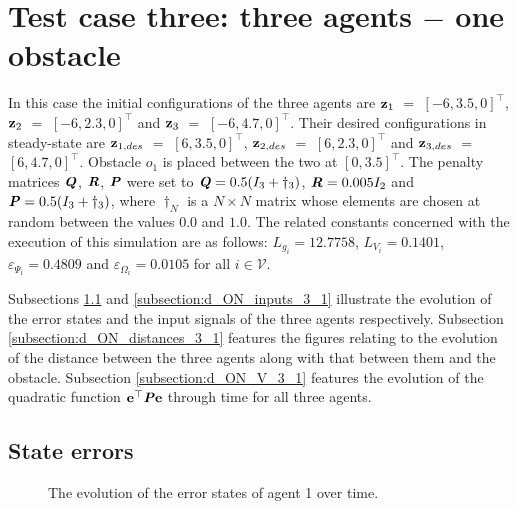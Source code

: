\section{Test case three: three agents $-$ one obstacle}

In this case the initial configurations of the three agents are
$\bm{\mathbf{z}}_1$ $=$ $[-6, 3.5, 0]^{\top}$,
$\bm{\mathbf{z}}_2$ $=$ $[-6, 2.3, 0]^{\top}$ and
$\bm{\mathbf{z}}_3$ $=$ $[-6, 4.7, 0]^{\top}$.
Their desired configurations in steady-state are
$\bm{\mathbf{z}}_{1,des}$ $=$ $[6, 3.5, 0]^{\top}$,
$\bm{\mathbf{z}}_{2,des}$ $=$ $[6, 2.3, 0]^{\top}$ and
$\bm{\mathbf{z}}_{3,des}$ $=$ $[6, 4.7, 0]^{\top}$.
Obstacle $o_1$ is placed between the two at $[0, 3.5]^{\top}$. The penalty
matrices $\bm{\mathit{Q}}$, $\bm{\mathit{R}}$, $\bm{\mathit{P}}$ were set to
$\bm{\mathit{Q}} = 0.5 (I_3 + \dagger_3)$, $\bm{\mathit{R}} = 0.005 I_2$ and
$\bm{\mathit{P}} = 0.5 (I_3 + \dagger_3)$, where $\dagger_N$ is a $N \times N$ matrix
whose elements are chosen at random between the values $0.0$ and $1.0$.
The related constants concerned with the execution
of this simulation are as follows: $L_{g_i} = 12.7758$, $L_{V_i} = 0.1401$,
$\varepsilon_{\Psi_i} = 0.4809$ and $\varepsilon_{\Omega_i} = 0.0105$ for
all $i \in \mathcal{V}$.

Subsections \ref{subsection:d_ON_errors_3_1} and
\ref{subsection:d_ON_inputs_3_1} illustrate the evolution of the error states
and the input signals of the three agents respectively. Subsection
\ref{subsection:d_ON_distances_3_1} features the figures relating to the
evolution of the distance between the three agents along with that between
them and the obstacle. Subsection \ref{subsection:d_ON_V_3_1}
features the evolution of the quadratic function
$\bm{\mathbf{e}}^{\top} \bm{\mathit{P}} \bm{\mathbf{e}}$ through time for all three agents.

\subsection{State errors}
\label{subsection:d_ON_errors_3_1}

\begin{figure}[H]\centering
  \scalebox{0.7}{}
  \caption{The evolution of the error states of agent 1 over time.}
  \label{fig:d_ON_3_1_errors_agent_1}
\end{figure}

